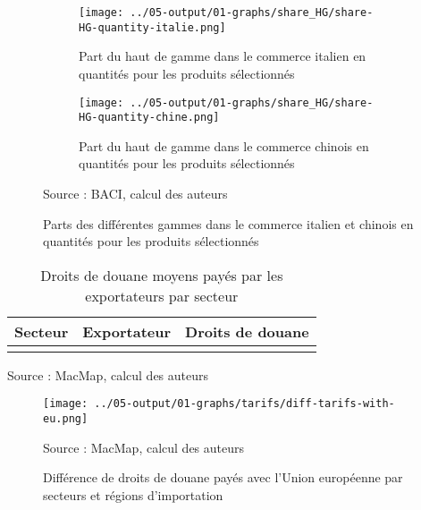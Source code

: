 \documentclass[french,10pt,a4paper]{article}
\begin{document}
\begin{figure}[!hp]
  \centering
  \begin{subfigure}{\textwidth}
    \centering    
    \texttt{[image: ../05-output/01-graphs/share\_HG/share-HG-quantity-italie.png]}
    \caption{Part du haut de gamme dans le commerce italien en quantités pour les produits sélectionnés}
    \label{fig:share-HG-quantity-italie}
  \end{subfigure}
  \vspace{0.5cm}
  \begin{subfigure}{\textwidth}
    \centering
 \texttt{[image: ../05-output/01-graphs/share\_HG/share-HG-quantity-chine.png]}
 \caption{Part du haut de gamme dans le commerce chinois en quantités pour les produits sélectionnés}
 \label{fig:share-HG-quantity-chine}
\end{subfigure}
\captionsetup{justification=raggedright,singlelinecheck=false, font=small}
  \caption*{Source : BACI, calcul des auteurs}
  \captionsetup{justification=centering, singlelinecheck=true, font=normalsize}
  \caption{Parts des différentes gammes dans le commerce italien et chinois en quantités pour les produits sélectionnés}
  \label{fig:share-HG-quantity-italie-chine}
\end{figure}

\newpage

\begin{table}[!hp]
  \centering
  \begin{tabular}{|c|c|c|}
    \hline
   Secteur & Exportateur & Droits de douane \\
    \hline
    \\
    \hline
  \end{tabular}
  \captionsetup{justification=justified, singlelinecheck=false, font=small}
  \caption*{Source : MacMap, calcul des auteurs}
  \captionsetup{justification=centering, singlelinecheck=true, font=normalsize}
  \caption{Droits de douane moyens payés par les exportateurs par secteur}
  \label{tab:tarifs-moyens-secteur}
\end{table}

\begin{figure}[!hb] %
    \centering
    \texttt{[image: ../05-output/01-graphs/tarifs/diff-tarifs-with-eu.png]}
    \captionsetup{justification=raggedright, singlelinecheck=false, font=small}
    \caption*{Source : MacMap, calcul des auteurs}
    \captionsetup{justification=centering, singlelinecheck=true, font=normalsize}
    \caption{Différence de droits de douane payés avec l'Union européenne par secteurs et régions d'importation}
    \label{fig:diff-tarifs}
\end{figure}
\end{document}
